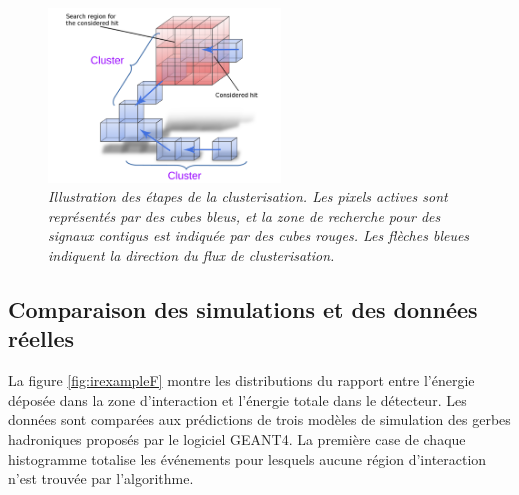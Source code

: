 \begin{figure}
	\centering
	\includegraphics[width=0.55\textwidth]{ECAL/graphics/demo-v3.pdf}
	\caption{\label{fig:democlusterF} \sl Illustration des étapes de la clusterisation. Les pixels actives sont représentés par des cubes bleus, et la zone de recherche pour des signaux contigus est indiquée par des cubes rouges. Les flèches bleues indiquent la direction du flux de clusterisation.}
\end{figure}

\newpage
\subsection*{Comparaison des simulations et des données réelles}
La figure \ref{fig:irexampleF} montre les distributions du rapport entre l'énergie déposée dans la zone d'interaction et l'énergie totale dans le détecteur. Les données sont comparées aux prédictions de trois modèles de simulation des gerbes hadroniques proposés par le logiciel GEANT4.  
La première case de chaque histogramme totalise les événements pour lesquels aucune région d'interaction n'est trouvée par l'algorithme.


